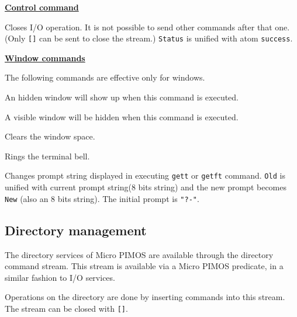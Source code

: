 \noindent\underline{\bf Control command}\vspace{1ex}\par
{}
\begin{itemize}

Closes I/O operation. It is not possible to send other commands after that
one. (Only \verb|[]| can be sent to close the stream.)
\verb|Status| is unified with atom \verb|success|.

\end{itemize}
\vspace{1ex}

\noindent\underline{\bf Window commands}\vspace{1ex}\par
{}
The following commands are effective only for windows.
\begin{itemize}

An hidden window will show up when this command is executed.

A visible window will be hidden when this command is executed.

Clears the window space.

Rings the terminal bell.

Changes prompt string displayed in executing \verb|gett| or \verb|getft|
command.  \verb|Old| is unified with current prompt string(8 bits string)
and the new prompt becomes \verb|New| (also an 8 bits string).
The initial prompt is \verb|"?-"|.

\end{itemize}

\subsection{Directory management}
\label{sec-MPIMOS-directory}

The directory services of Micro PIMOS are available through the directory
command stream.
This stream is available via a Micro PIMOS predicate,
in a similar fashion to I/O services.

Operations on the directory are done by inserting commands into this stream.
The stream can be closed with \verb|[]|.

